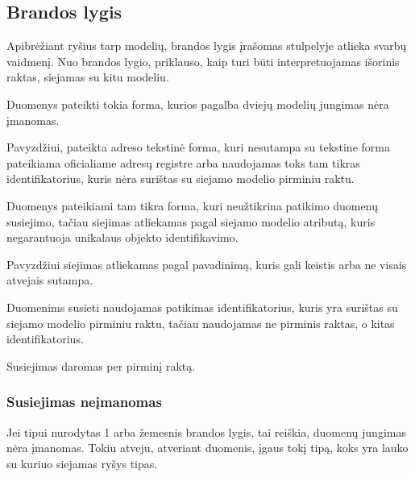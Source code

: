 \documentclass[letterpaper,10pt,lithuanian]{sphinxmanual}
\begin{document}
\subsection{Brandos lygis}
\label{\detokenize{identifikatoriai:brandos-lygis}}\label{\detokenize{identifikatoriai:ref-level}}
\sphinxAtStartPar
Apibrėžiant ryšius tarp modelių, brandos lygis įrašomas {\hyperref[\detokenize{formatas:level}]{}}
stulpelyje atlieka svarbų vaidmenį. Nuo brandos lygio, priklauso, kaip turi būti
interpretuojamas išorinis raktas, siejamas su kitu modeliu.
\begin{description}
\sphinxAtStartPar
Duomenys pateikti tokia forma, kurios pagalba dviejų modelių jungimas nėra
įmanomas.

\sphinxAtStartPar
Pavyzdžiui, pateikta adreso tekstinė forma, kuri nesutampa su tekstine
forma pateikiama oficialiame adresų registre arba naudojamas toks tam
tikras identifikatorius, kuris nėra surištas su siejamo modelio pirminiu
raktu.

\sphinxAtStartPar
Duomenys pateikiami tam tikra forma, kuri neužtikrina patikimo duomenų
susiejimo, tačiau siejimas atliekamas pagal siejamo modelio atributą, kuris
negarantuoja unikalaus objekto identifikavimo.

\sphinxAtStartPar
Pavyzdžiui siejimas atliekamas pagal pavadinimą, kuris gali keistis arba ne
visais atvejais sutampa.

\sphinxAtStartPar
Duomenims susieti naudojamas patikimas identifikatorius, kuris yra surištas su
siejamo modelio pirminiu raktu, tačiau naudojamas ne pirminis raktas, o
kitas identifikatorius.

\sphinxAtStartPar
Susiejimas daromas per pirminį raktą.

\end{description}


\subsubsection{Susiejimas neįmanomas}
\label{\detokenize{identifikatoriai:susiejimas-neimanomas}}
\sphinxAtStartPar
Jei  tipui nurodytas 1 arba žemesnis brandos lygis, tai reiškia, duomenų
jungimas nėra įmanomas. Tokiu atveju, atveriant duomenis,  įgaus tokį
tipą, koks yra lauko su kuriuo siejamas ryšys tipas.
\end{document}
